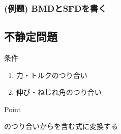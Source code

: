 \documentclass[a4paper]{jsarticle}
\begin{document}
\subsubsection{(例題) BMDとSFDを書く}

\subsection{不静定問題}
\begin{itembox}[l]{条件}
    \begin{enumerate}[(1)]
        \item 力・トルクのつり合い
        \item 伸び・ねじれ角のつり合い
    \end{enumerate}
\end{itembox}
\begin{itembox}[l]{Point}
    \begin{center}
        のつり合いからを含む式に変換する
    \end{center}
\end{itembox}
\end{document}

